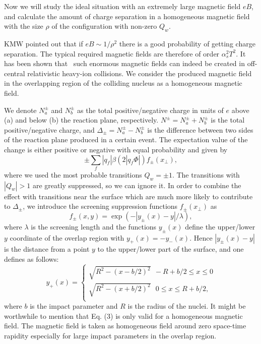 \documentclass[twocolumn,showpacs,preprintnumbers,amsmath,amssymb]{revtex4}
\begin{document}
Now we will study the ideal situation with an extremely large magnetic field $eB$, and calculate the amount of charge separation in a homogeneous
magnetic field with the size $\rho$ of the configuration with non-zero $Q_{w}$.

KMW pointed out that if $eB\sim 1/{\rho^2}$  there is a good probability of getting charge separation.  The typical required magnetic fields are therefore of
order  $\alpha_{s}^{2}T^{2}$. It has been shown that~\cite{lab12,lab13,lab14,lab15,lab16} such enormous magnetic fields can indeed be created in off-central relativistic
heavy-ion collisions.  We consider the produced magnetic field in the overlapping region of the colliding nucleus as a homogeneous magnetic field.

We denote $N_{a}^{\pm}$ and $N_{b}^{\pm}$  as the total positive/negative charge in units of $e$ above (a)
and below (b) the reaction plane, respectively. $N^{\pm} = N_{a}^{\pm}+ N_{b}^{\pm}$ is  the total
positive/negative charge, and $\Delta_{\pm}=N_{a}^{\pm}-N_{b}^{\pm}$ is the difference between
two sides of the reaction plane produced in a certain event. The expectation value of the change is either
positive or negative with equal probability and given by
\begin{equation}%
\pm\sum_{f}|q_{f}|\beta(2|q_{f}\Phi|)f_{\pm}(x_{\perp}),
\label{eq:eq3} %
\end{equation}
\noindent where we used the most probable transitions $Q_{w}=\pm1$. The transitions with $|Q_{w}|>1$ are greatly suppressed, so we can ignore it.
In order to combine the effect with  transitions near the surface which are much more likely to contribute to $\Delta_{\pm}$, we introduce
the screening suppression functions $f_{\pm}(x_{\perp})$ as
\begin{equation} %
f_{\pm}(x,y)=\exp(-|y_{\pm}(x)-y|/\lambda),
\label{eq:eq4} %
\end{equation}
\noindent where $\lambda$ is the screening length and the functions $y_{\pm}(x)$ define the upper/lower $y$
coordinate of the overlap region with $y_{+}(x)=-y_{-}(x)$. Hence $|y_{\pm}(x)-y|$ is the distance from a point $y$ to the upper/lower part of the surface, and
one defines as follows:
\begin{equation}  %
y_{+}(x)=
 \left\{
\begin{aligned}
\sqrt{R^{2}-(x-b/2)^{2}}~~-R+b/2\leq x\leq0\\
\sqrt{R^{2}-(x+b/2)^{2}}~~~0\leq x\leq {R+b/2},\\
\end{aligned}
\right.
\label{eq:eq5} %
\end{equation}
\noindent where $b$ is the impact parameter and $R$ is the radius of the nuclei. It might be worthwhile to mention that Eq. (3) is only valid for a homogeneous magnetic field.
The magnetic field is taken as homogeneous  field around zero space-time rapidity especially for large impact
parameters in the overlap region.
\end{document}
